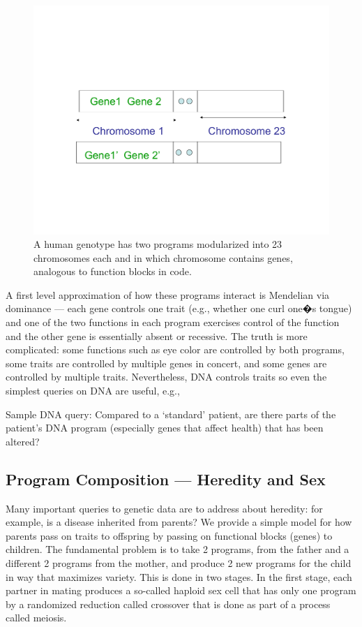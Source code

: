 \documentclass[10pt,fullpage]{article}
\begin{document}
\begin{figure}[h!]
  \centering
\includegraphics[trim = 0mm 60mm 0mm 80mm, clip, width=4.5in]{fig/chromosomes.pdf}
\caption{A human genotype has two programs modularized into 23
  chromosomes each and in which chromosome contains genes, analogous
  to function blocks in code.}
  \label{fig:chromosomes}
\end{figure}

A first level approximation of how these programs interact is
Mendelian via dominance --- each gene controls one trait (e.g.,
whether one curl one�s tongue) and one of the two functions in each
program exercises control of the function and the other gene is
essentially absent or recessive.  The truth is more complicated: some
functions such as eye color are controlled by both programs, some
traits are controlled by multiple genes in concert, and some genes are
controlled by multiple traits.  Nevertheless, DNA controls traits so
even the simplest queries on DNA are useful, e.g.,

Sample DNA query: Compared to a `standard' patient, are there parts of
the patient's DNA program (especially genes that affect health) that
has been altered?
  
\subsection{Program Composition --- Heredity and Sex}

Many important queries to genetic data are to address about heredity:
for example, is a disease inherited from parents? We provide a simple
model for how parents pass on traits to offspring by passing on
functional blocks (genes) to children.  The fundamental problem is to
take 2 programs, from the father and a different 2 programs from the
mother, and produce 2 new programs for the child in way that maximizes
variety.  This is done in two stages.  In the first stage, each
partner in mating produces a so-called haploid sex cell that has only
one program by a randomized reduction called crossover that is done as
part of a process called meiosis.
\end{document}
